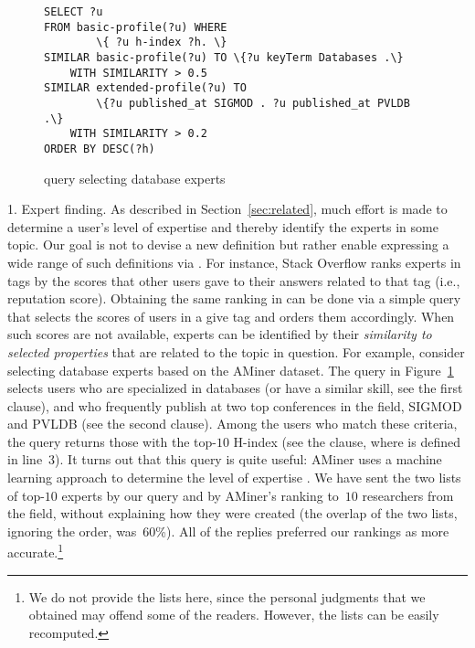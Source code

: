    
\begin{figure}
{\scriptsize
\begin{Verbatim}
SELECT ?u
FROM basic-profile(?u) WHERE
        \{ ?u h-index ?h. \}
SIMILAR basic-profile(?u) TO \{?u keyTerm Databases .\}
    WITH SIMILARITY > 0.5
SIMILAR extended-profile(?u) TO
        \{?u published_at SIGMOD . ?u published_at PVLDB .\}
    WITH SIMILARITY > 0.2
ORDER BY DESC(?h)
\end{Verbatim}
} \vspace{-2mm} \caption{\qlang{} query selecting database experts} \label{fig:experts}
\vspace{-4mm}
\end{figure}   
\textsf{1. Expert finding.} As described in Section~\ref{sec:related}, much effort is made to determine a user's level of expertise and thereby identify the experts in some topic. Our goal is not to devise a new definition but rather enable expressing a wide range of such definitions via \qlang{}. For instance, Stack Overflow ranks experts in tags by the scores that other users gave to their answers related to that tag (i.e., reputation score). Obtaining the same ranking in \qlang{} can be done via a simple query that selects the scores of users in a give tag and orders them accordingly. When such scores are not available, experts can be identified by their \emph{similarity to selected properties} that are related to the topic in question. For example, consider selecting database experts based on the AMiner dataset. The \qlang{} query in Figure~\ref{fig:experts} selects users who are specialized in databases (or have a similar skill, see the first  clause), and who frequently publish at two top conferences in the field, SIGMOD and PVLDB (see the second   clause). Among the users who match these criteria, the query returns those with the top-$10$ H-index (see the  clause, where  is defined in line~3). It turns out that this query is quite useful: AMiner uses a machine learning approach to determine the level of expertise \cite{Tang:2011:TLE:1938275.1938277}. We have sent the two lists of top-$10$ experts by our query and by AMiner's ranking to~$10$ researchers from the field, without explaining how they were created (the overlap of the two lists, ignoring the order, was~60\%). All of the replies preferred our rankings as more accurate.\footnote{We do not provide the lists here, since the personal judgments that we obtained may offend some of the readers. However, the lists can be easily recomputed.}

